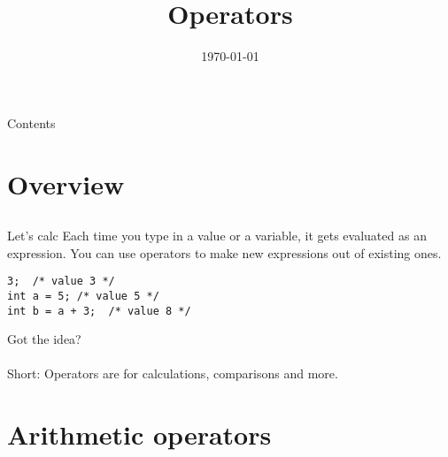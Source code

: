 
\newcommand{\topic}{
	Operators
}

\title{\topic}
\supertitle{\course}
\date{\today}



\maketitle

\begin{frame}{Contents}
	\tableofcontents
\end{frame}

\section{Overview}
\subsection{}
\begin{frame}[fragile]{Let's calc}
	Each time you type in a value or a variable, it gets evaluated as an expression. You can use operators to make new expressions out of existing ones.
	\begin{lstlisting}[numbers=none]
3;	/* value 3 */
int a = 5; /* value 5 */
int b = a + 3;	/* value 8 */
\end{lstlisting}
Got the idea?\\
\ \\Short: Operators are for calculations, comparisons and more.
\end{frame}
\section{Arithmetic operators}

